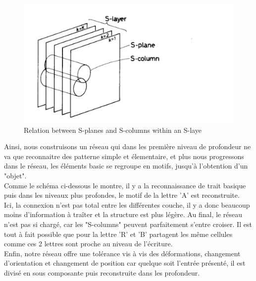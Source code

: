 \documentclass[12pt, letterpaper]{article}
\begin{document}
\begin{figure}[H]
    \includegraphics[width=\linewidth]{img/fig3.png}
    \caption{Relation between S-planes and S-columns within an S-laye}
    \label{fig:L3}
\end{figure}

Ainsi, nous construisons un réseau qui dans les première niveau de profondeur ne va que reconnaitre des patterne simple et élementaire, et plus nous progressons 
dans le réseau, les éléments basic se regroupe en motifs, jusqu'à l'obtention d'un "objet".\\
Comme le schéma ci-dessous le montre, il y a la reconnaissance de trait basique puis dans les niveaux plus profondes, le motif de la lettre 'A' est 
reconstruite. \\
Ici, la connexion n'est pas total entre les différentes couche, il y a donc beaucoup moins d'information à traîter et la structure est plus légère.
Au final, le réseau n'est pas si chargé, car les "S-columns" peuvent parfaitement s'entre croiser. Il est tout à fait possible que pour la lettre 
'R' et 'B' partagent les même cellules comme ces 2 lettres sont proche au niveau de l'écriture. \\
Enfin, notre réseau offre une tolérance vis à vis des déformations, changement d'orientation et changement de position car quelque soit 
l'entrée présenté, il est divisé en sous composante puis reconstruite dans les profondeur.
\end{document}
